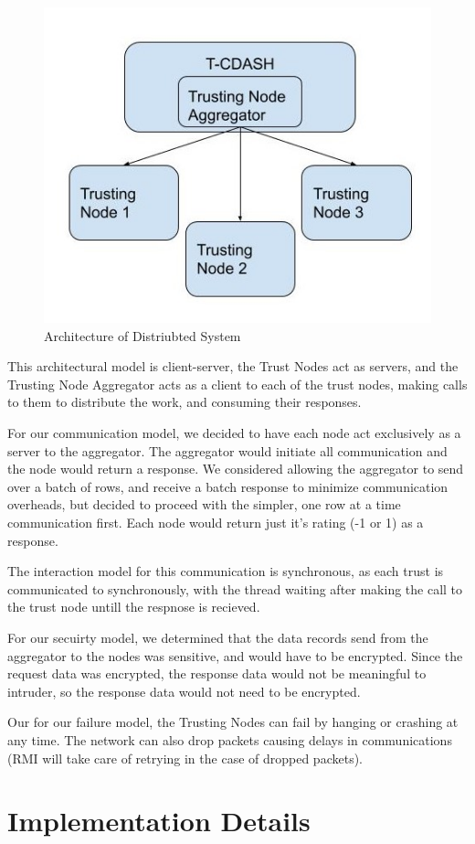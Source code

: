 \documentclass[11pt]{article}
\begin{document}
\begin{figure}
  \centering
  \includegraphics[width=.5\textwidth]{pics/Architecture.jpg}
  \caption{Architecture of Distriubted System}
  \label{arch}
\end{figure}

This architectural model is client-server, the Trust Nodes act as servers, and the Trusting Node Aggregator acts as a client to each of the trust nodes, making calls to them to distribute the work, and consuming their responses.

For our communication model, we decided to have each node act exclusively as a server to the aggregator. The aggregator would initiate all communication and the node would return a response. We considered allowing the aggregator to send over a batch of rows, and receive a batch response to minimize communication overheads, but decided to proceed with the simpler, one row at a time communication first. Each node would return just it's rating (-1 or 1) as a response.

The interaction model for this communication is synchronous, as each trust is communicated to synchronously, with the thread waiting after making the call to the trust node untill the respnose is recieved.

For our secuirty model, we determined that the data records send from the aggregator to the nodes was sensitive, and would have to be encrypted. Since the request data was encrypted, the response data would not be meaningful to intruder, so the response data would not need to be encrypted.

Our for our failure model, the Trusting Nodes can fail by hanging or crashing at any time. The network can also drop packets causing delays in communications (RMI will take care of retrying in the case of dropped packets).

\section{Implementation Details}
\end{document}
